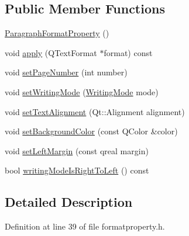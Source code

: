 \subsection*{Public Member Functions}
\begin{DoxyCompactItemize}
\item 
\hyperlink{classOOO_1_1ParagraphFormatProperty_a08f6a722cf53aa6451ad963ec2b0102c}{Paragraph\+Format\+Property} ()
\item 
void \hyperlink{classOOO_1_1ParagraphFormatProperty_a7f45453913ad9d57285c0f1e797fba52}{apply} (Q\+Text\+Format $\ast$format) const 
\item 
void \hyperlink{classOOO_1_1ParagraphFormatProperty_a81f0c2e87dd71baa3b5107d1e1e29efd}{set\+Page\+Number} (int number)
\item 
void \hyperlink{classOOO_1_1ParagraphFormatProperty_a395fd2120339c29fcefab881b474346a}{set\+Writing\+Mode} (\hyperlink{classOOO_1_1ParagraphFormatProperty_ad1278a086adbef8bae4546ffae6f7655}{Writing\+Mode} mode)
\item 
void \hyperlink{classOOO_1_1ParagraphFormatProperty_aad7c221a2406bc15aa1bc3ed0d9e01ab}{set\+Text\+Alignment} (Qt\+::\+Alignment alignment)
\item 
void \hyperlink{classOOO_1_1ParagraphFormatProperty_ac9d8317ce162c3f5eb04e8bca9a41b02}{set\+Background\+Color} (const Q\+Color \&color)
\item 
void \hyperlink{classOOO_1_1ParagraphFormatProperty_a0dc53dc5c17a301a85ba8bc340c0f83b}{set\+Left\+Margin} (const qreal margin)
\item 
bool \hyperlink{classOOO_1_1ParagraphFormatProperty_a93eb33b8a695cca8f08ebb00ca01fde7}{writing\+Mode\+Is\+Right\+To\+Left} () const 
\end{DoxyCompactItemize}


\subsection{Detailed Description}


Definition at line 39 of file formatproperty.\+h.



